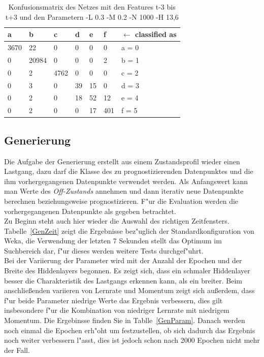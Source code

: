 \begin{table}[p]
\begin{tabular}{llllll|l}
a & b & c & d & e & f & $\leftarrow$ classified as  \\
\hline
3670 & 22 & 0 & 0 & 0 & 0 & a = 0  \\
0 & 20984 & 0 & 0 & 0 & 2 & b = 1  \\
0 & 2 & 4762 & 0 & 0 & 0 & c = 2  \\
0 & 3 & 0 & 39 & 15 & 0 & d = 3  \\
0 & 2 & 0 & 18 & 52 & 12 & e = 4  \\
0 & 2 & 0 & 0 & 17 & 401 & f = 5  \\
\end{tabular}
\caption[Konfusionsmatrix]{Konfusionsmatrix des Netzes mit den Features t-3 bis t+3 und den Parametern -L 0.3 -M 0.2 -N 1000 -H 13,6}
\label{EvalConf}
\end{table}

\newpage
\subsection{Generierung}
\label{EvalGenerierung}
Die Aufgabe der Generierung erstellt aus einem Zustandsprofil wieder einen Lastgang, dazu darf die Klasse des zu prognostizierenden Datenpunktes und die ihm vorhergegangenen Datenpunkte verwendet werden. Als Anfangswert kann man Werte des \textit{Off-Zustands} annehmen und dann iterativ neue Datenpunkte berechnen beziehungsweise prognostizieren. F"ur die Evaluation werden die vorhergegangenen Datenpunkte als gegeben betrachtet. \\

Zu Beginn steht auch hier wieder die Auswahl des richtigen Zeitfensters. Tabelle~\ref{GenZeit} zeigt die Ergebnisse bez"uglich der Standardkonfiguration von Weka, die Verwendung der letzten 7 Sekunden stellt das Optimum im Suchbereich dar, f"ur dieses werden weitere Tests durchgef"uhrt.\\

Bei der Variierung der Parameter wird mit der Anzahl der Epochen und der Breite des Hiddenlayers begonnen. Es zeigt sich, dass ein schmaler Hiddenlayer besser die Charakteristik des Lastgangs erkennen kann, als ein breiter. Beim anschlie{\ss}enden variieren von Lernrate und Momentum zeigt sich au{\ss}erdem, dass f"ur beide Parameter niedrige Werte das Ergebnis verbessern, dies gilt insbesondere f"ur die Kombination von niedriger Lernrate mit niedrigem Momentum. Die Ergebinsse finden Sie in Tablle~\ref{GenParam}. 
Danach werden noch einmal die Epochen erh"oht um festzustellen, ob sich dadurch das Ergebnis noch weiter verbessern l"asst, dies ist jedoch schon nach 2000 Epochen nicht mehr der Fall. \\

